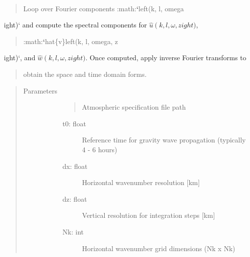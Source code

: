 \documentclass[letterpaper,10pt,english]{sphinxmanual}
\begin{document}
\begin{fulllineitems}
\label{\detokenize{stochprop.gravity:stochprop.gravity_waves.perturbations}}~\begin{quote}

Loop over Fourier components :math:{\color{red}\bfseries{}{}`}left(k, l, omega
\end{quote}

ight){}` and compute the spectral components for \(\hat{u} \left(k, l, \omega, z 
ight)\),
\begin{quote}

:math:{\color{red}\bfseries{}{}`}hat\{v\}left(k, l, omega, z
\end{quote}

ight){}`, and \(\hat{w} \left(k, l, \omega, z 
ight)\).  Once computed, apply inverse Fourier transforms to
\begin{quote}

obtain the space and time domain forms.
\end{quote}
\begin{quote}\begin{description}
\item[{Parameters}] \leavevmode\begin{description}
\item[{}] \leavevmode\begin{quote}

Atmospheric specification file path
\end{quote}
\begin{description}
\item[{t0: float}] \leavevmode
Reference time for gravity wave propagation (typically 4 - 6 hours)

\item[{dx: float}] \leavevmode
Horizontal wavenumber resolution {[}km{]}

\item[{dz: float}] \leavevmode
Vertical resolution for integration steps {[}km{]}

\item[{Nk: int}] \leavevmode
Horizontal wavenumber grid dimensions (Nk x Nk)


\end{description}
\end{description}
\end{description}
\end{quote}
\end{fulllineitems}
\end{document}

